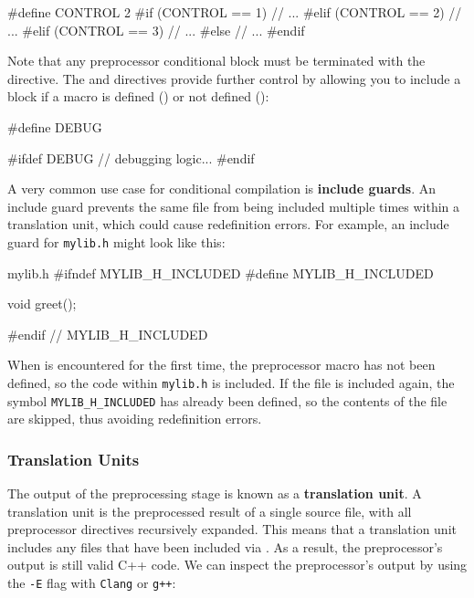 \documentclass[12pt]{article}
\begin{document}
\begin{cxx}{}
#define CONTROL 2
#if (CONTROL == 1)
	// ...
#elif (CONTROL == 2)
	// ...
#elif (CONTROL == 3)
	// ...
#else
	// ...
#endif
\end{cxx}

\noindent
Note that any preprocessor conditional block must be terminated with the  directive.
The  and  directives provide further control by allowing you to include a block if a macro is defined () or not defined ():

\begin{cxx}{}
#define DEBUG

#ifdef DEBUG
	// debugging logic...
#endif
\end{cxx}

\noindent
A very common use case for conditional compilation is \textbf{include guards}.
An include guard prevents the same file from being included multiple times within a translation unit, which could cause redefinition errors.
For example, an include guard for \texttt{mylib.h} might look like this:

\begin{cxx}{mylib.h}
#ifndef MYLIB_H_INCLUDED
#define MYLIB_H_INCLUDED

void greet();

#endif // MYLIB_H_INCLUDED
\end{cxx}

\noindent
When  is encountered for the first time, the preprocessor macro  has not been defined, so the code within \texttt{mylib.h} is included.
If the file is included again, the symbol \texttt{MYLIB\_H\_INCLUDED} has already been defined, so the contents of the file are skipped, thus avoiding redefinition errors.

\subsubsection{Translation Units}
\label{sec:translation-units}

\noindent
The output of the preprocessing stage is known as a \textbf{translation unit}.
A translation unit is the preprocessed result of a single source file, with all preprocessor directives recursively expanded.
This means that a translation unit includes any files that have been included via .
As a result, the preprocessor's output is still valid C++ code.
We can inspect the preprocessor's output by using the \texttt{-E} flag with \texttt{Clang} or \texttt{g++}:
\end{document}
